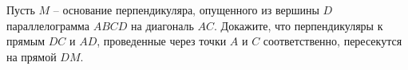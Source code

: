 \begin{ex}
	\begin{condition}
		Пусть \( M \) – основание перпендикуляра, опущенного из	вершины \( D  \) параллелограмма \( ABCD  \) на диагональ \( AC \). Докажите, что перпендикуляры к прямым \( DC  \) и \( AD \), проведенные	через точки \( A  \) и \( C  \) соответственно, пересекутся на прямой \( DM  \).
	\end{condition}
\end{ex}